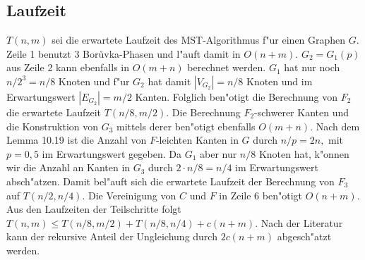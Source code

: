\subsection{Laufzeit}

$T(n,m)$ sei die erwartete Laufzeit des MST-Algorithmus f"ur einen Graphen $G$.
    Zeile 1 benutzt 3 Bor\r uvka-Phasen und  l"auft damit in $O(n+m)$. 
    $G_2 = G_1(p)$ aus Zeile 2 kann ebenfalls in $O(m + n)$ berechnet werden.
    $G_1$ hat nur noch $n/2^3 = n/8$ Knoten und f"ur $G_2$ hat damit 
    $|V_{G_2}| = n/8$ Knoten und im Erwartungswert $|E_{G_2}| = m/2$ Kanten.
    Folglich ben"otigt die Berechnung von $F_2$  die erwartete Laufzeit 
    $T(n/8,m/2)$.
    Die Berechnung $F_2$-schwerer Kanten und die Konstruktion von $G_3$ mittels
    derer ben"otigt ebenfalls $O(m+n)$.
    Nach dem Lemma 10.19 \cite{randAlg} ist die Anzahl von $F$-leichten Kanten in $G$ durch
    $n/p = 2n,$ mit $p = 0,5$ im Erwartungswert gegeben. Da $G_1$
    aber nur $n/8$ Knoten hat, k"onnen wir die Anzahl an Kanten in $G_3$
    durch $2 \cdot n/8 = n/4$ im Erwartungswert absch"atzen.
    Damit bel"auft sich die erwartete Laufzeit der Berechnung von $F_3$ auf
    $T(n/2, n/4)$.
    Die Vereinigung von $C$ und $F$ in Zeile 6 ben"otigt $O(n+m)$.\\
Aus den Laufzeiten der Teilschritte folgt
    $T(n,m) \leq T(n/8, m/2) + T(n/8, n/4) + c(n+m)$.
    Nach der Literatur kann der rekursive Anteil der Ungleichung durch $2c(n+m)$ 
    abgesch"atzt werden.
    \\
